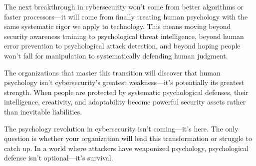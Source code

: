 \documentclass[10pt, twocolumn]{article}
\begin{document}
The next breakthrough in cybersecurity won't come from better algorithms or faster processors—it will come from finally treating human psychology with the same systematic rigor we apply to technology. This means moving beyond security awareness training to psychological threat intelligence, beyond human error prevention to psychological attack detection, and beyond hoping people won't fall for manipulation to systematically defending human judgment.

The organizations that master this transition will discover that human psychology isn't cybersecurity's greatest weakness—it's potentially its greatest strength. When people are protected by systematic psychological defenses, their intelligence, creativity, and adaptability become powerful security assets rather than inevitable liabilities.

The psychology revolution in cybersecurity isn't coming—it's here. The only question is whether your organization will lead this transformation or struggle to catch up. In a world where attackers have weaponized psychology, psychological defense isn't optional—it's survival.
\end{document}
